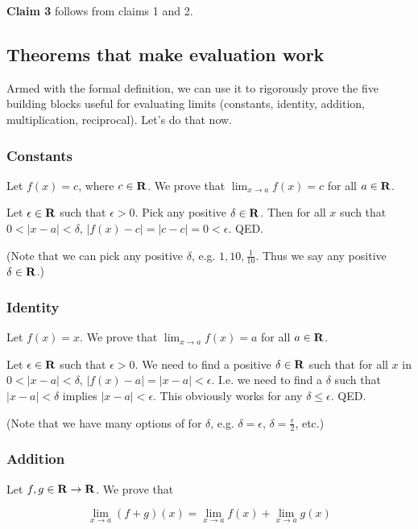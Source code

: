 \textbf{Claim 3} follows from claims 1 and 2.

\subsection{Theorems that make evaluation work}

Armed with the formal definition, we can use it to rigorously prove
the five building blocks useful for evaluating limits (constants,
identity, addition, multiplication, reciprocal). Let's do that now.

\subsubsection*{Constants}
Let $f(x)=c$, where $c\in\mathbf{R}$. We prove that $\lim_{x\to a}f(x)=c$ for all $a\in\mathbf{R}$.

\vs

Let $\epsilon\in\mathbf{R}$ such that $\epsilon>0$. Pick any positive
$\delta\in\mathbf{R}$. Then for all $x$ such that $0<|x-a|<\delta$,
$|f(x)-c|=|c-c|=0<\epsilon$. QED.

\vs

(Note that we can pick any positive $\delta$, e.g.
$1, 10, \frac{1}{10}$. Thus we say any positive $\delta\in\mathbf{R}$.)

\subsubsection*{Identity}

Let $f(x)=x$. We prove that $\lim_{x\to a}f(x)=a$ for all $a\in\mathbf{R}$.

\vs

Let $\epsilon\in\mathbf{R}$ such that $\epsilon>0$. We need to find a positive
$\delta\in\mathbf{R}$ such that for all $x$ in $0<|x-a|<\delta$,
$|f(x)-a|=|x-a|<\epsilon$. I.e. we need to find a $\delta$ such that
$|x-a|<\delta$ implies $|x-a|<\epsilon$. This obviously works for any $\delta\leq\epsilon$. QED.

\vs

(Note that we have many options of for $\delta$, e.g.
$\delta=\epsilon$, $\delta=\frac{\epsilon}{2}$, etc.)

\subsubsection*{Addition}

Let $f,g\in\mathbf{R}\to\mathbf{R}$. We prove that

\[\lim_{x\to a}(f+g)(x)=\lim_{x\to a}f(x)+\lim_{x\to a}g(x)\]

